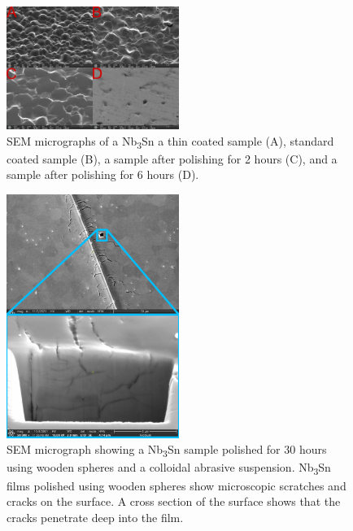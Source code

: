 \documentclass[reprint,amsmath,amssymb,aps]{revtex4-2}%
\begin{document}
%


\begin{figure}[t]%
\centering%
\includegraphics[width=0.5\textwidth]{../doc/figs/SEM_Images.png}%
\caption{SEM micrographs of a Nb\textsubscript{3}Sn a thin coated sample (A), standard coated sample (B), a sample after polishing for 2 hours (C), and a sample after polishing for 6 hours (D).}%
\label{fig:semimages}%
\end{figure}

%


\begin{figure}[t]%
\centering%
\includegraphics[width=0.5\textwidth]{../doc/figs/Sample_Surface_Scratches.png}%
\caption{SEM micrograph showing a Nb\textsubscript{3}Sn sample polished for 30 hours using wooden spheres and a colloidal abrasive suspension. Nb\textsubscript{3}Sn films polished using wooden spheres show microscopic scratches and cracks on the surface. A cross section of the surface shows that the cracks penetrate deep into the film.}%
\label{fig:samplesurfacescratches}%
\end{figure}

%
\end{document}
